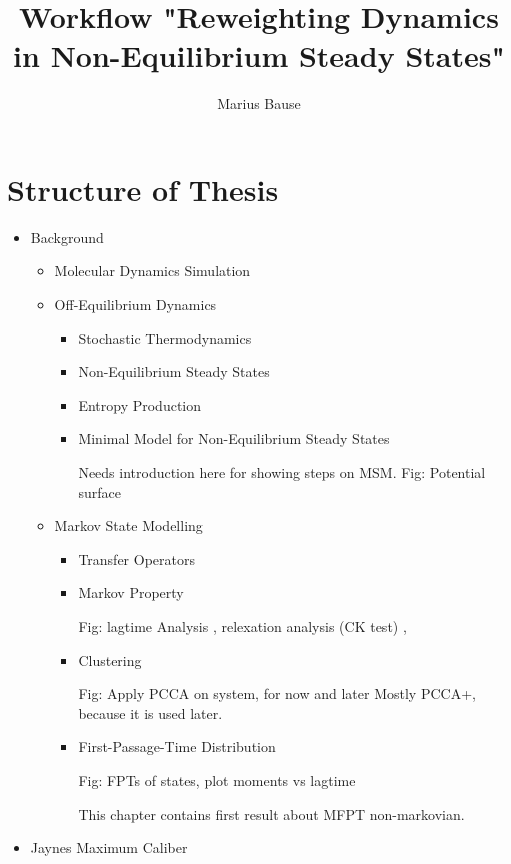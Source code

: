 \documentclass[a4paper,10pt]{article}
\title{Workflow "Reweighting Dynamics in Non-Equilibrium Steady States"}
\author{Marius Bause}
\begin{document}
\maketitle

\section{Structure of Thesis}

\begin{itemize}
  \item Background
  \begin{itemize}
 
    \item Molecular Dynamics Simulation
    \item Off-Equilibrium Dynamics
    \begin{itemize}
      \item Stochastic Thermodynamics
      \item Non-Equilibrium Steady States

      \item Entropy Production 
      \item Minimal Model for Non-Equilibrium Steady States
          
            Needs introduction here for showing steps on MSM. 
            Fig:  Potential surface 
    \end{itemize}
    
    \item Markov State Modelling
    \begin{itemize}
      \item Transfer Operators 
      \item Markov Property 
         
         Fig: lagtime Analysis , relexation analysis (CK test) , 
      \item Clustering 
      
        Fig: Apply PCCA on system, for now and later
      Mostly PCCA+, because it is used later. 
      \item First-Passage-Time Distribution
      
        Fig: FPTs of states, plot moments vs lagtime  
      
      This chapter contains first result about MFPT non-markovian. 
    \end{itemize}
  \end{itemize}
   
  \item Jaynes Maximum Caliber
  

\end{itemize}
\end{document}
